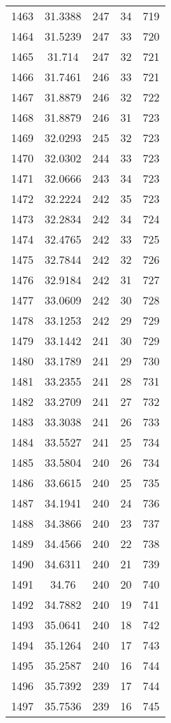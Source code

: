 \documentclass[12pt,a4paper]{article}
\begin{document}
\begin{tabular}{r|cccc}
	1463 & 31.3388 & 247 & 34 & 719 \\
	1464 & 31.5239 & 247 & 33 & 720 \\
	1465 & 31.714 & 247 & 32 & 721 \\
	1466 & 31.7461 & 246 & 33 & 721 \\
	1467 & 31.8879 & 246 & 32 & 722 \\
	1468 & 31.8879 & 246 & 31 & 723 \\
	1469 & 32.0293 & 245 & 32 & 723 \\
	1470 & 32.0302 & 244 & 33 & 723 \\
	1471 & 32.0666 & 243 & 34 & 723 \\
	1472 & 32.2224 & 242 & 35 & 723 \\
	1473 & 32.2834 & 242 & 34 & 724 \\
	1474 & 32.4765 & 242 & 33 & 725 \\
	1475 & 32.7844 & 242 & 32 & 726 \\
	1476 & 32.9184 & 242 & 31 & 727 \\
	1477 & 33.0609 & 242 & 30 & 728 \\
	1478 & 33.1253 & 242 & 29 & 729 \\
	1479 & 33.1442 & 241 & 30 & 729 \\
	1480 & 33.1789 & 241 & 29 & 730 \\
	1481 & 33.2355 & 241 & 28 & 731 \\
	1482 & 33.2709 & 241 & 27 & 732 \\
	1483 & 33.3038 & 241 & 26 & 733 \\
	1484 & 33.5527 & 241 & 25 & 734 \\
	1485 & 33.5804 & 240 & 26 & 734 \\
	1486 & 33.6615 & 240 & 25 & 735 \\
	1487 & 34.1941 & 240 & 24 & 736 \\
	1488 & 34.3866 & 240 & 23 & 737 \\
	1489 & 34.4566 & 240 & 22 & 738 \\
	1490 & 34.6311 & 240 & 21 & 739 \\
	1491 & 34.76 & 240 & 20 & 740 \\
	1492 & 34.7882 & 240 & 19 & 741 \\
	1493 & 35.0641 & 240 & 18 & 742 \\
	1494 & 35.1264 & 240 & 17 & 743 \\
	1495 & 35.2587 & 240 & 16 & 744 \\
	1496 & 35.7392 & 239 & 17 & 744 \\
	1497 & 35.7536 & 239 & 16 & 745 \\

\end{tabular}
\end{document}
